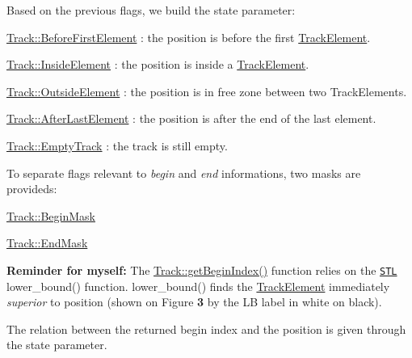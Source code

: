 Based on the previous flags, we build the {\ttfamily state} parameter\+:
\begin{DoxyItemize}
\item \hyperlink{classKite_1_1Track_af4bdc8469c0fee386fc2ff30e0666bcaa5c7f72d6942ae38d66f530bea1063adf}{Track\+::\+Before\+First\+Element} \+: the {\ttfamily position} is before the first \hyperlink{classKite_1_1TrackElement}{Track\+Element}.
\item \hyperlink{classKite_1_1Track_af4bdc8469c0fee386fc2ff30e0666bcaa36e625d718c74f5ff503638360ba1166}{Track\+::\+Inside\+Element} \+: the {\ttfamily position} is inside a \hyperlink{classKite_1_1TrackElement}{Track\+Element}.
\item \hyperlink{classKite_1_1Track_af4bdc8469c0fee386fc2ff30e0666bcaa55d08f66f21334eb8c0dca170f1cb8a4}{Track\+::\+Outside\+Element} \+: the {\ttfamily position} is in free zone between two Track\+Elements.
\item \hyperlink{classKite_1_1Track_af4bdc8469c0fee386fc2ff30e0666bcaa3fc579452c9779cd2865d5019a61c6a5}{Track\+::\+After\+Last\+Element} \+: the position is after the end of the last element.
\item \hyperlink{classKite_1_1Track_af4bdc8469c0fee386fc2ff30e0666bcaaa697b71e325cea0980e9555654f8f3cf}{Track\+::\+Empty\+Track} \+: the track is still empty.
\end{DoxyItemize}

To separate flags relevant to {\itshape begin} and {\itshape end} informations, two masks are provideds\+:
\begin{DoxyItemize}
\item \hyperlink{classKite_1_1Track_af4bdc8469c0fee386fc2ff30e0666bcaa8621fa6a5b7a491fd1bf8dd7f0dd3589}{Track\+::\+Begin\+Mask}
\item \hyperlink{classKite_1_1Track_af4bdc8469c0fee386fc2ff30e0666bcaa0b5a81972d3a6718c3d68199467d2d11}{Track\+::\+End\+Mask}
\end{DoxyItemize}

 {\bfseries Reminder for myself\+:} The \hyperlink{classKite_1_1Track_a33a6c0eebb0d4d50f639ae49a4d6252f}{Track\+::get\+Begin\+Index()} function relies on the \href{http://www.sgi.com/tech/stl/}{\tt S\+TL} {\ttfamily lower\+\_\+bound()} function. {\ttfamily lower\+\_\+bound()} finds the \hyperlink{classKite_1_1TrackElement}{Track\+Element} immediately {\itshape superior} to {\ttfamily position} (shown on Figure {\bfseries 3} by the {\ttfamily LB} label in white on black).

The relation between the returned {\ttfamily begin} index and the position is given through the {\ttfamily state} parameter. \mbox{\label{classKite_1_1Track_aeeb787cb8a5ccbedc8697ea6811af2f6}} 

